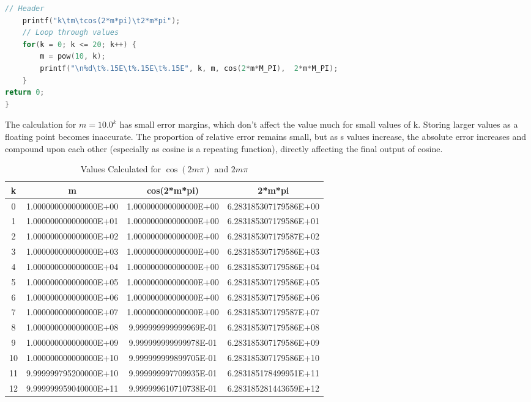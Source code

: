 \documentclass{exam}
\begin{document}
\begin{questions}
\begin{lstlisting}[language=c, frame=single, breaklines=true, label=amb, caption=Code]
	// Header
	printf("k\tm\tcos(2*m*pi)\t2*m*pi");
	// Loop through values
	for(k = 0; k <= 20; k++) {
		m = pow(10, k);
		printf("\n%d\t%.15E\t%.15E\t%.15E", k, m, cos(2*m*M_PI),  2*m*M_PI);
	}
return 0;
}
\end{lstlisting}
\vspace{5mm}
The calculation for $m = 10.0^{k}$ has small error margins, which don't affect the value much for small values of k. Storing larger values as a floating point becomes inaccurate. The proportion of relative error remains small, but as s values increase, the absolute error increases and compound upon each other (especially as cosine is a repeating function), directly affecting the final output of cosine.
\newpage
\begin{table}[]
\centering
\caption{Values Calculated for $\cos(2m\pi)$ and $2m\pi$}
\begin{tabular}{| c | c | c | c |}
\hline
k & m & cos(2*m*pi) & 2*m*pi \\ \hline
0 & 1.000000000000000E+00 & 1.000000000000000E+00 & 6.283185307179586E+00 \\ \hline
1 & 1.000000000000000E+01 & 1.000000000000000E+00 & 6.283185307179586E+01 \\ \hline
2 & 1.000000000000000E+02 & 1.000000000000000E+00 & 6.283185307179587E+02 \\ \hline
3 & 1.000000000000000E+03 & 1.000000000000000E+00 & 6.283185307179586E+03 \\ \hline
4 & 1.000000000000000E+04 & 1.000000000000000E+00 & 6.283185307179586E+04 \\ \hline
5 & 1.000000000000000E+05 & 1.000000000000000E+00 & 6.283185307179586E+05 \\ \hline
6 & 1.000000000000000E+06 & 1.000000000000000E+00 & 6.283185307179586E+06 \\ \hline
7 & 1.000000000000000E+07 & 1.000000000000000E+00 & 6.283185307179587E+07 \\ \hline
8 & 1.000000000000000E+08 & 9.999999999999969E-01 & 6.283185307179586E+08 \\ \hline
9 & 1.000000000000000E+09 & 9.999999999999978E-01 & 6.283185307179586E+09 \\ \hline
10 & 1.000000000000000E+10 & 9.999999999899705E-01 & 6.283185307179586E+10 \\ \hline
11 & 9.999999795200000E+10 & 9.999999997709935E-01 & 6.283185178499951E+11 \\ \hline
12 & 9.999999959040000E+11 & 9.999999610710738E-01 & 6.283185281443659E+12 \\ \hline

\end{tabular}
\end{table}
\end{questions}
\end{document}
